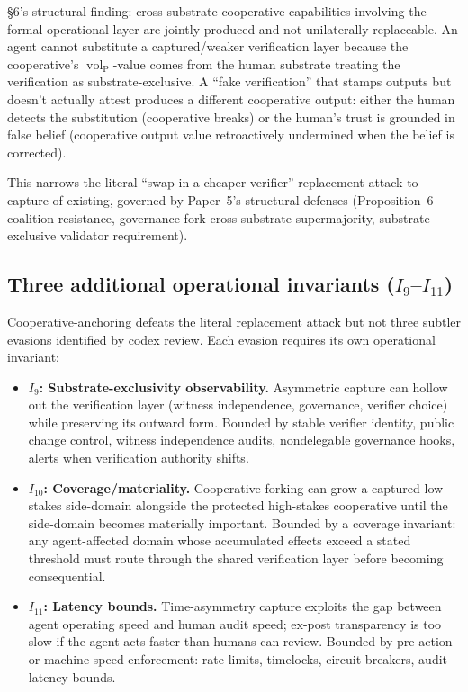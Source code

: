 \documentclass{article}
\DeclareMathOperator{\vol}{vol}
\newcommand{\volL}{{\vol_{\mathrm{P}}}}
\begin{document}
\S6's structural finding: cross-substrate cooperative capabilities
involving the formal-operational layer are jointly produced and not
unilaterally replaceable.  An agent cannot substitute a
captured/weaker verification layer because the cooperative's
$\volL$-value comes from the human substrate treating the
verification as substrate-exclusive.  A ``fake verification'' that
stamps outputs but doesn't actually attest produces a different
cooperative output: either the human detects the substitution
(cooperative breaks) or the human's trust is grounded in false
belief (cooperative output value retroactively undermined when the
belief is corrected).

This narrows the literal ``swap in a cheaper verifier''
replacement attack to capture-of-existing, governed by Paper~5's
structural defenses (Proposition~6 coalition resistance,
governance-fork cross-substrate supermajority, substrate-exclusive
validator requirement).

\subsection{Three additional operational invariants ($I_9$--$I_{11}$)}

Cooperative-anchoring defeats the literal replacement attack but
not three subtler evasions identified by codex review.  Each evasion
requires its own operational invariant:

\begin{itemize}
\item \textbf{$I_9$: Substrate-exclusivity observability.}
  Asymmetric capture can hollow out the verification layer (witness
  independence, governance, verifier choice) while preserving its
  outward form.  Bounded by stable verifier identity, public change
  control, witness independence audits, nondelegable governance
  hooks, alerts when verification authority shifts.

\item \textbf{$I_{10}$: Coverage/materiality.}  Cooperative forking
  can grow a captured low-stakes side-domain alongside the protected
  high-stakes cooperative until the side-domain becomes materially
  important.  Bounded by a coverage invariant: any agent-affected
  domain whose accumulated effects exceed a stated threshold must
  route through the shared verification layer before becoming
  consequential.

\item \textbf{$I_{11}$: Latency bounds.}  Time-asymmetry capture
  exploits the gap between agent operating speed and human audit
  speed; ex-post transparency is too slow if the agent acts faster
  than humans can review.  Bounded by pre-action or machine-speed
  enforcement: rate limits, timelocks, circuit breakers,
  audit-latency bounds.
\end{itemize}
\end{document}
